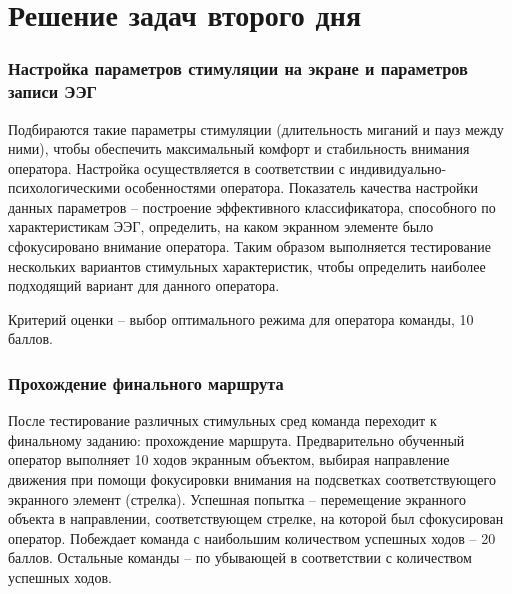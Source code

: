 \section{Решение задач второго дня}

\subsubsection*{Настройка параметров стимуляции на экране и параметров записи ЭЭГ}

Подбираются такие параметры стимуляции (длительность миганий и пауз между ними), чтобы обеспечить максимальный комфорт и стабильность внимания оператора. Настройка осуществляется в соответствии с индивидуально-психологическими особенностями оператора. Показатель качества настройки данных параметров – построение эффективного классификатора, способного по характеристикам ЭЭГ, определить, на каком экранном элементе было сфокусировано внимание оператора. Таким образом выполняется тестирование нескольких вариантов стимульных характеристик, чтобы определить наиболее подходящий вариант для данного оператора.

Критерий оценки – выбор оптимального режима для оператора команды, 10 баллов.

\subsubsection*{Прохождение финального маршрута}

После тестирование различных стимульных сред команда переходит к финальному заданию: прохождение маршрута. Предварительно обученный оператор выполняет 10 ходов экранным объектом, выбирая направление движения при помощи фокусировки внимания на подсветках соответствующего экранного элемент (стрелка). Успешная попытка – перемещение экранного объекта в направлении, соответствующем стрелке, на которой был сфокусирован оператор. Побеждает команда с наибольшим количеством успешных ходов – 20 баллов. Остальные команды – по убывающей в соответствии с количеством успешных ходов.